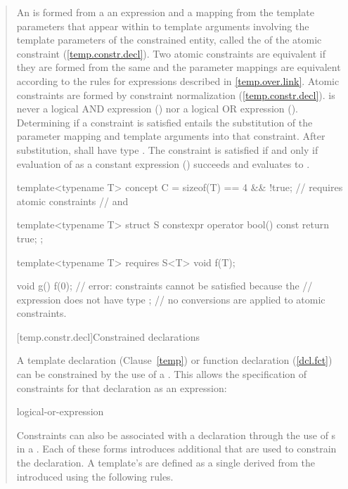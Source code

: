 \begin{quote}
\begin{addedblock}
\pnum
An  is formed from a
an expression 
and a mapping from the template parameters
that appear within  to template arguments involving the
template parameters of the constrained entity, called the  of the atomic constraint (\ref{temp.constr.decl}).
\enternote
Two atomic constraints are equivalent if they are formed from the same
 and the parameter mappings are equivalent
according to the rules for expressions described in \ref{temp.over.link}.
% 
\enternote
Atomic constraints are formed by constraint normalization (\ref{temp.constr.decl}).
 is never a logical AND expression ()
nor a logical OR expression ().
\exitnote
% 
Determining if a constraint is satisfied entails the substitution 
of the parameter mapping and template arguments into that constraint.
% 
After substitution,  shall have type .
% 
The constraint is satisfied if and only if evaluation of 
as a constant expression () succeeds and 
evaluates to .
% 
\enterexample
\begin{codeblock}
template<typename T> 
  concept C = sizeof(T) == 4 && !true; // requires atomic constraints
                                       //  and 

template<typename T>
  struct S {
    constexpr operator bool() const { return true; }
  };

template<typename T>
  requires S<T>{}
    void f(T);

void g() {
  f(0); // error: constraints cannot be satisfied because the
        // expression  does not have type ;
        // no conversions are applied to atomic constraints.
}
\end{codeblock}
\exitexample


[temp.constr.decl]{Constrained declarations}

\pnum
A template declaration (Clause~\ref{temp}) or function declaration 
(\ref{dcl.fct}) can be constrained by the use of a 
. 
% 
This allows the specification of constraints for that declaration as
an expression:

\begin{bnf}
\br
    logical-or-expression
\end{bnf}

\pnum
Constraints can also be associated with a declaration through the use of 
s in a 
.
% 
Each of these forms introduces additional  
that are used to constrain the declaration.
% 
A template's  are defined as a 
single  derived from the
introduced  using the
following rules.


\end{addedblock}
\end{quote}
